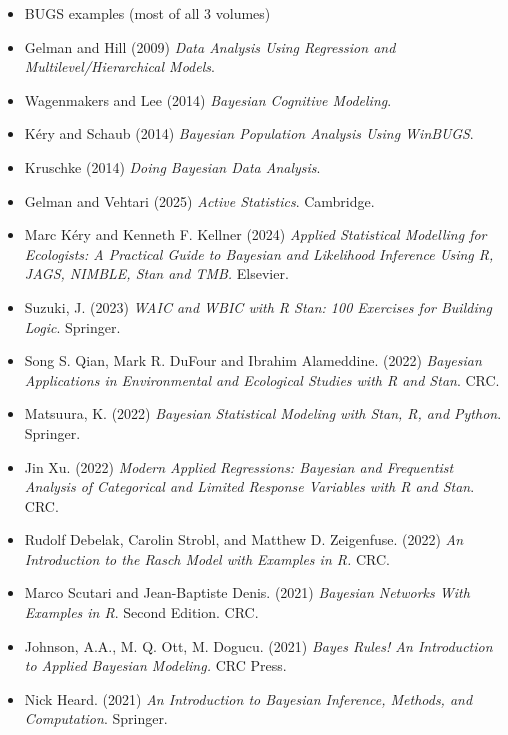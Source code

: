 \documentclass[10pt]{report}
\begin{document}
%
\begin{itemize}
\item BUGS examples (most of all 3 volumes)
\item Gelman and Hill (2009) {\slshape Data Analysis Using Regression and
    Multilevel/Hierarchical Models}.
\item Wagenmakers and Lee (2014) {\slshape Bayesian Cognitive
    Modeling}.
\item K\'ery and Schaub (2014) {\slshape Bayesian Population Analysis
    Using WinBUGS}.
\item Kruschke (2014) {\slshape Doing Bayesian Data Analysis}.
\end{itemize}

%
{\footnotesize
\begin{itemize}
\item Gelman and Vehtari (2025) {\slshape Active
    Statistics}. Cambridge.
\item Marc K\'ery and Kenneth F. Kellner (2024)
{\slshape Applied Statistical Modelling for Ecologists: A Practical
  Guide to Bayesian and Likelihood Inference Using R, JAGS, NIMBLE,
  Stan and TMB.} Elsevier.  
\item Suzuki, J. (2023) {\slshape WAIC and WBIC with R Stan: 100
    Exercises for Building Logic}. Springer.
\item Song S. Qian, Mark R. DuFour and Ibrahim Alameddine. (2022)
  {\slshape Bayesian Applications in Environmental and Ecological
    Studies with R and Stan}. CRC.  
\item Matsuura, K. (2022) {\slshape Bayesian Statistical Modeling with Stan, R, and Python}. Springer.
\item Jin Xu. (2022) {\slshape Modern Applied Regressions: Bayesian and Frequentist Analysis of Categorical and Limited Response Variables with R and Stan}. CRC.
  \item Rudolf Debelak, Carolin Strobl, and Matthew D. Zeigenfuse. (2022) {\slshape An Introduction to the Rasch Model with Examples in R.} CRC.
  \item Marco Scutari and Jean-Baptiste Denis. (2021) {\slshape Bayesian Networks With Examples in R}. Second Edition. CRC.
\item Johnson, A.A., M. Q. Ott, M. Dogucu. (2021) {\slshape Bayes Rules! An Introduction to Applied Bayesian Modeling.} CRC Press.
\item Nick Heard. (2021) {\slshape An Introduction to Bayesian Inference, Methods, and Computation}. Springer.

\end{itemize}}
\end{document}
